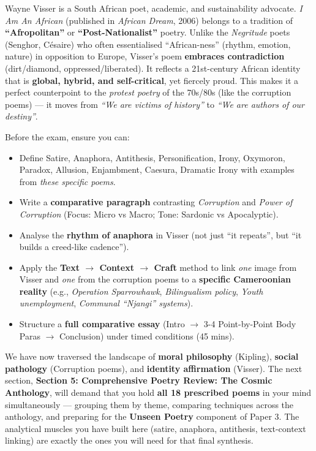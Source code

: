 \documentclass[11pt]{article}
\newcommand{\cle}[1]{{\popxbold\color{popdark}#1}}
\newcounter{popsec}
\newcounter{popsub}
\newcommand{\courssub}[1]{%
  \stepcounter{popsub}%
  \par\vspace{9pt}\noindent{\popxbold\fontsize{11.5}{13}\selectfont\color{popink}{\color{poporange}\thepopsec.\thepopsub}\hspace{6pt}#1}\par\nopagebreak\vspace{4pt}
}
\begin{document}
\begin{savaistu}
Wayne Visser is a South African poet, academic, and sustainability advocate. \emph{I Am An African} (published in \emph{African Dream}, 2006) belongs to a tradition of \textbf{``Afropolitan''} or \textbf{``Post-Nationalist''} poetry. Unlike the \emph{Negritude} poets (Senghor, Césaire) who often essentialised ``African-ness'' (rhythm, emotion, nature) in opposition to Europe, Visser's poem \textbf{embraces contradiction} (dirt/diamond, oppressed/liberated). It reflects a 21st-century African identity that is \textbf{global, hybrid, and self-critical}, yet fiercely proud. This makes it a perfect counterpoint to the \emph{protest poetry} of the 70s/80s (like the corruption poems) — it moves from \emph{``We are victims of history''} to \emph{``We are authors of our destiny''}.
\end{savaistu}

\begin{attention}
Before the exam, ensure you can:
\begin{itemize}
    \item Define \cle{Satire}, \cle{Anaphora}, \cle{Antithesis}, \cle{Personification}, \cle{Irony}, \cle{Oxymoron}, \cle{Paradox}, \cle{Allusion}, \cle{Enjambment}, \cle{Caesura}, \cle{Dramatic Irony} with examples from \emph{these specific poems}.
    \item Write a \textbf{comparative paragraph} contrasting \emph{Corruption} and \emph{Power of Corruption} (Focus: Micro vs Macro; Tone: Sardonic vs Apocalyptic).
    \item Analyse the \textbf{rhythm of anaphora} in Visser (not just ``it repeats'', but ``it builds a creed-like cadence'').
    \item Apply the \textbf{Text $\to$ Context $\to$ Craft} method to link \emph{one} image from Visser and \emph{one} from the corruption poems to a \textbf{specific Cameroonian reality} (e.g., \emph{Operation Sparrowhawk}, \emph{Bilingualism policy}, \emph{Youth unemployment}, \emph{Communal ``Njangi'' systems}).
    \item Structure a \textbf{full comparative essay} (Intro $\to$ 3-4 Point-by-Point Body Paras $\to$ Conclusion) under timed conditions (45 mins).
\end{itemize}
\end{attention}

\courssub{Transition to Next Section}
We have now traversed the landscape of \textbf{moral philosophy} (Kipling), \textbf{social pathology} (Corruption poems), and \textbf{identity affirmation} (Visser). The next section, \textbf{Section 5: Comprehensive Poetry Review: The Cosmic Anthology}, will demand that you hold \textbf{all 18 prescribed poems} in your mind simultaneously — grouping them by theme, comparing techniques across the anthology, and preparing for the \textbf{Unseen Poetry} component of Paper 3. The analytical muscles you have built here (satire, anaphora, antithesis, text-context linking) are exactly the ones you will need for that final synthesis.
\end{document}
